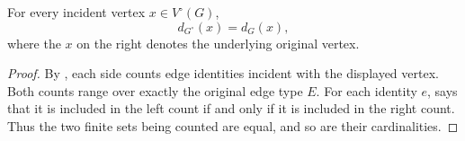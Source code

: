\begin{lemma}
For every incident vertex $x\in V^{\circ}(G)$,
\[
 d_{G^{\circ}}(x)=d_G(x),
\]
where the $x$ on the right denotes the underlying original vertex.
\end{lemma}
\begin{proof}
By , each side counts edge identities incident with the
displayed vertex.  Both counts range over exactly the original edge type
$E$.  For each identity $e$,  says that it
is included in the left count if and only if it is included in the right
count.  Thus the two finite sets being counted are equal, and so are their
cardinalities.
\end{proof}
